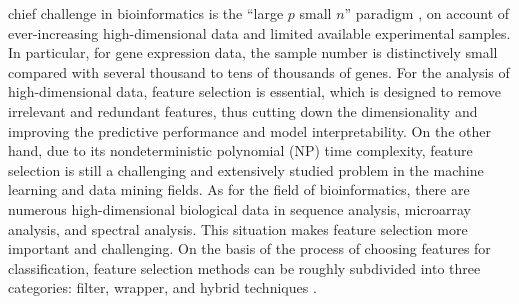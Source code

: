 \documentclass[10pt,journal,compsoc]{IEEEtran}
\begin{document}
	\maketitle
	\IEEEpeerreviewmaketitle
	

	 chief challenge in bioinformatics is the ``large \(p\) small \(n\)'' paradigm \cite{W1}, on account of ever-increasing high-dimensional data and limited available experimental samples. In particular, for gene expression data, the sample number is distinctively small compared with several thousand to tens of thousands of genes. 
	For the analysis of high-dimensional data, feature selection is essential, which is designed to remove irrelevant and redundant features, thus cutting down the dimensionality and improving the predictive performance and model interpretability. On the other hand, due to its nondeterministic polynomial (NP) time complexity, feature selection is still a challenging and extensively studied problem in the machine learning and data mining fields. 
	As for the field of bioinformatics, there are numerous high-dimensional biological data in sequence analysis, microarray analysis, and spectral analysis. This situation makes feature selection more important and challenging.
	On the basis of the process of choosing features for classification, feature selection methods can be roughly subdivided into three categories: filter, wrapper, and hybrid techniques \cite{W6}.
	
\end{document}
